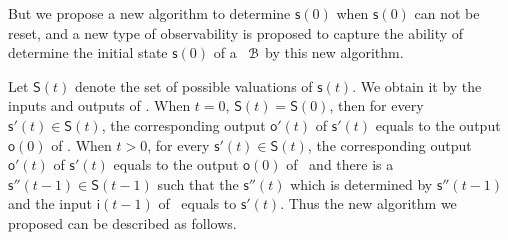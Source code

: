 But we propose a new algorithm to determine $\mathsf{s}(0)$ when $\mathsf{s}(0)$ can not be reset, and a new type of observability is proposed to capture the ability of determine the initial state $\mathsf{s}(0)$ of a \BCN\ ${\mathcal{B}}$ by this new algorithm.%

Let $\mathsf{S}(t)$ denote the set of possible valuations of $\mathsf{s}(t)$. We obtain it by the inputs and outputs of \BCN. When $t=0$, $\mathsf{S}(t)=\mathsf{S}(0)$, then for every $\mathsf{s}'(t)\in\mathsf{S}(t)$, the corresponding output $\mathsf{o}'(t)$ of $\mathsf{s}'(t)$ equals to the output $\mathsf{o}(0)$ of \BCN. When $t>0$, for every $\mathsf{s}'(t)\in\mathsf{S}(t)$, the corresponding output $\mathsf{o}'(t)$ of $\mathsf{s}'(t)$ equals to the output $\mathsf{o}(0)$ of \BCN\ and there is a $\mathsf{s}''(t-1)\in\mathsf{S}(t-1)$ such that the $\mathsf{s}''(t)$ which is determined by $\mathsf{s}''(t-1)$ and the input $\mathsf{i}(t-1)$ of \BCN\ equals to $\mathsf{s}'(t)$.
Thus the new algorithm we proposed can be described as follows. 



